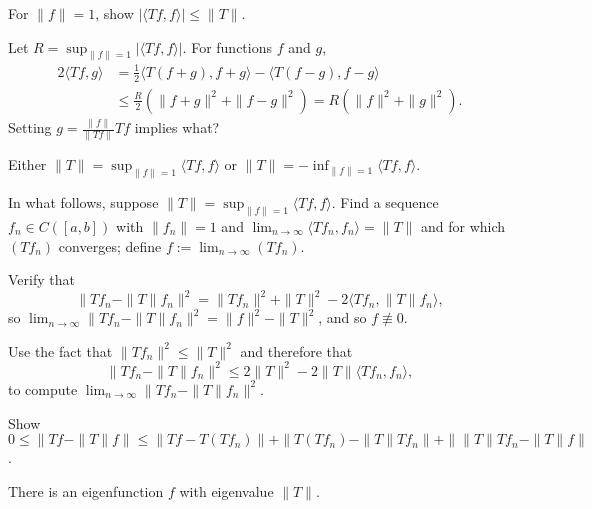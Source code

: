 \documentclass{homework}
\begin{document}
\begin{problem}
  For $\|f\|=1$, show $\left| \langle Tf, f \rangle \right| \leq \|T\|$.
\end{problem}

\begin{problem}
  Let $R = \sup_{\|f\|=1} \left| \langle Tf, f \rangle \right|$.  For functions $f$ and $g$,
  \begin{align*}
2 \langle Tf,g \rangle
&= \frac{1}{2} \langle T(f+g),f+g \rangle - \langle T(f-g),f-g \rangle \\
    &\leq \frac{R}{2} ( \|f+g\|^2 + \|f-g\|^2 ) = R(\|f\|^2 + \|g\|^2).
  \end{align*}
  Setting $g = \frac{\|f\|}{\|Tf\|} Tf$ implies what?
\end{problem}

\begin{problem}
  Either $\|T\| = \sup_{\|f\|=1} \langle Tf, f \rangle$ or  $\|T\| = -\inf_{\|f\|=1} \langle Tf, f \rangle$.
\end{problem}

\begin{problem}
  In what follows, suppose $\|T\| = \sup_{\|f\|=1} \langle Tf, f \rangle$.  Find a sequence $f_n \in C([a,b])$ with $\|f_n\|=1$ and $\lim_{n \to \infty} \langle Tf_n,f_n \rangle = \|T\|$ and for which $(Tf_n)$ converges; define $f := \lim_{n \to \infty} (Tf_n)$.
\end{problem}

\begin{problem}
  Verify that
  \[
    \| Tf_n - \|T\| f_n \|^2 =
    \| Tf_n \|^2 + \|T\|^2 - 2 \langle Tf_n,  \|T\| f_n \rangle,
  \]
  so $\lim_{n \to \infty} \| Tf_n - \|T\| f_n \|^2 = \|f\|^2 - \|T\|^2$, and so $f \not\equiv 0$.
\end{problem}

\begin{problem}
  Use the fact that $\|Tf_n\|^2 \leq \|T\|^2$ and therefore that
  \[
    \| Tf_n - \|T\| f_n \|^2 \leq
    2 \|T\|^2 - 2 \|T\|
     \langle Tf_n,   f_n \rangle,
   \]
   to compute $\lim_{n \to \infty} \| Tf_n - \|T\| f_n \|^2$.
\end{problem}

\begin{problem}
  Show $0 \leq \| Tf - \|T\|f \| \leq \| Tf - T(Tf_n) \| + \| T(Tf_n) - \|T\| Tf_n \| + \| \|T\| Tf_n - \|T\| f \|$.
\end{problem}

\begin{problem}
  There is an eigenfunction $f$ with eigenvalue $\| T \|$.
\end{problem}
\end{document}
